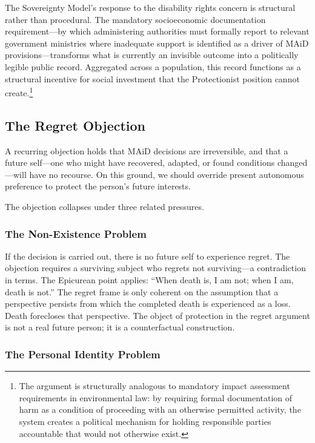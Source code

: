 \documentclass[11pt, letterpaper]{article}
\begin{document}
The Sovereignty Model's response to the disability rights concern is structural rather
than procedural. The mandatory socioeconomic documentation requirement---by which
administering authorities must formally report to relevant government ministries where
inadequate support is identified as a driver of MAiD provisions---transforms what is
currently an invisible outcome into a politically legible public record. Aggregated
across a population, this record functions as a structural incentive for social
investment that the Protectionist position cannot create.\footnote{%
  The argument is structurally analogous to mandatory impact assessment requirements
  in environmental law: by requiring formal documentation of harm as a condition of
  proceeding with an otherwise permitted activity, the system creates a political
  mechanism for holding responsible parties accountable that would not otherwise exist.}

\subsection{The Regret Objection}

A recurring objection holds that MAiD decisions are irreversible, and that a future
self---one who might have recovered, adapted, or found conditions changed---will have
no recourse. On this ground, we should override present autonomous preference to protect
the person's future interests.

The objection collapses under three related pressures.

\subsubsection{The Non-Existence Problem}

If the decision is carried out, there is no future self to experience regret. The
objection requires a surviving subject who regrets not surviving---a contradiction in
terms. The Epicurean point applies: ``When death is, I am not; when I am, death is
not.'' The regret frame is only coherent on the assumption that a perspective persists
from which the completed death is experienced as a loss. Death forecloses that
perspective. The object of protection in the regret argument is not a real future person;
it is a counterfactual construction.

\subsubsection{The Personal Identity Problem}
\end{document}
